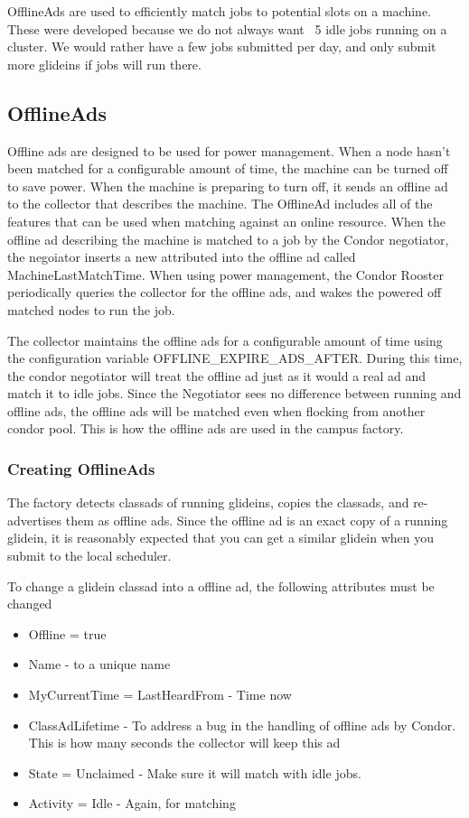 \documentclass[11pt]{article}
\begin{document}
OfflineAds are used to efficiently match jobs to potential slots on a machine.  These were developed because we do not always want ~5 idle jobs running on a cluster.  We would rather have a few jobs submitted per day, and only submit more glideins if jobs will run there.


\subsection{OfflineAds}
Offline ads are designed to be used for power management. When a node hasn't been matched for a configurable amount of time, the machine can be turned off to save power. When the machine is preparing to turn off, it sends an offline ad to the collector that describes the machine. The OfflineAd includes all of the features that can be used when matching against an online resource.  When the offline ad describing the machine is matched to a job by the Condor negotiator, the negoiator inserts a new attributed into the offline ad called MachineLastMatchTime.  When using power management, the Condor Rooster periodically queries the collector for the offline ads, and wakes the powered off matched nodes to run the job.

The collector maintains the offline ads for a configurable amount of time using the configuration variable OFFLINE\_EXPIRE\_ADS\_AFTER. During this time, the condor negotiator will treat the offline ad just as it would a real ad and match it to idle jobs. Since the Negotiator sees no difference between running and offline ads, the offline ads will be matched even when flocking from another condor pool.  This is how the offline ads are used in the campus factory.

\subsubsection{Creating OfflineAds}
The factory detects classads of running glideins, copies the classads, and re-advertises them as offline ads. Since the offline ad is an exact copy of a running glidein, it is reasonably expected that you can get a similar glidein when you submit to the local scheduler.

To change a glidein classad into a offline ad, the following attributes must be changed

\begin{itemize}
\item Offline = true
\item Name - to a unique name
\item MyCurrentTime = LastHeardFrom - Time now
\item ClassAdLifetime - To address a bug in the handling of offline ads by Condor. This is how many seconds the collector will keep this ad
\item State = Unclaimed - Make sure it will match with idle jobs.
\item Activity = Idle - Again, for matching 
\end{itemize}
\end{document}
